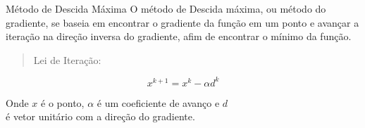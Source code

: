 \begin{frame}{Método de Descida Máxima}
	O método de Descida máxima, ou método do gradiente, se baseia em encontrar o gradiente da função em um ponto e avançar a iteração na direção inversa do gradiente, afim de encontrar o mínimo da função.
	
	\begin{quote}
		\centering
		Lei de Iteração:
	\end{quote}

	\begin{equation}
	x^{k+1} = x^k - \alpha d^k
	\end{equation}
	
	Onde $x$ é o ponto, $\alpha$ é um coeficiente de avanço e $d$ \\é vetor unitário com a direção do gradiente.
	
	
\end{frame}